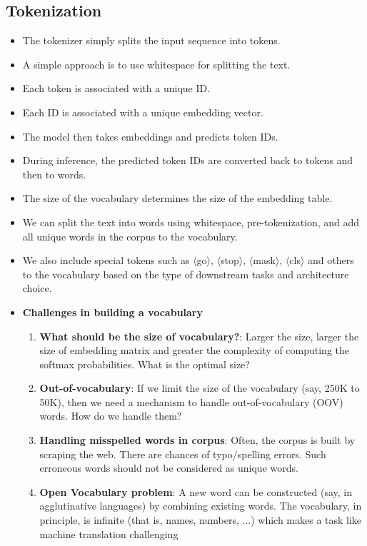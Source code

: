 \documentclass[a4paper]{article}
\begin{document}
\subsection{Tokenization}
\begin{itemize}
    \item The tokenizer simply splits the input sequence into tokens.
    \item A simple approach is to use whitespace for splitting the text.
    \item Each token is associated with a unique ID.
    \item Each ID is associated with a unique embedding vector.
    \item The model then takes embeddings and predicts token IDs.
    \item During inference, the predicted token IDs are converted back to tokens and then to words.
    \item The size of the vocabulary determines the size of the embedding table.
    \item We can split the text into words using whitespace, pre-tokenization, and add all unique words in the corpus to the vocabulary.
    \item We also include special tokens such as $\langle$go$\rangle$, $\langle$stop$\rangle$, $\langle$mask$\rangle$, $\langle$cls$\rangle$ and others to the vocabulary based on the type of downstream tasks and architecture choice.
    \item \textbf{Challenges in building a vocabulary}
    \begin{enumerate}
        \item \textbf{What should be the size of vocabulary?}: Larger the size, larger the size of embedding matrix and greater the complexity of computing the softmax probabilities. What is the optimal size?
        \item \textbf{Out-of-vocabulary}: If we limit the size of the vocabulary (say, 250K to 50K), then we need a mechanism to handle out-of-vocabulary (OOV) words. How do we handle them?
        \item \textbf{Handling misspelled words in corpus}: Often, the corpus is built by scraping the web. There are chances of typo/spelling errors. Such erroneous words should not be considered as unique words.
        \item \textbf{Open Vocabulary problem}: A new word can be constructed (say, in agglutinative languages) by combining existing words. The vocabulary, in principle, is infinite (that is, names, numbers, ...) which makes a task like machine translation challenging

\end{enumerate}
\end{itemize}
\end{document}
